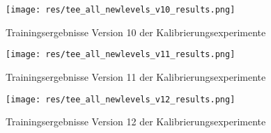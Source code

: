 \documentclass[11pt]{scrartcl}
\begin{document}
\begin{figure}[htp]
\texttt{[image: res/tee\_all\_newlevels\_v10\_results.png]}
\caption{Trainingsergebnisse Version 10 der Kalibrierungsexperimente}
\end{figure}

\begin{figure}[htp]
\texttt{[image: res/tee\_all\_newlevels\_v11\_results.png]}
\caption{Trainingsergebnisse Version 11 der Kalibrierungsexperimente}
\end{figure}

\begin{figure}[htp]
\texttt{[image: res/tee\_all\_newlevels\_v12\_results.png]}
\caption{Trainingsergebnisse Version 12 der Kalibrierungsexperimente}
\end{figure}
\end{document}
